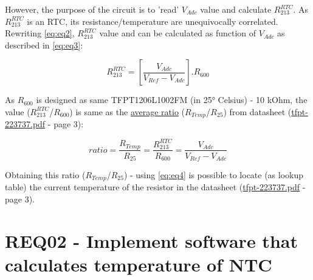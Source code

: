 \documentclass{article}
\begin{document}
	
	However, the purpose of the circuit is to 'read' \(V_{Adc}\) value and calculate \(R_{213}^{RTC}\). As \(R_{213}^{RTC}\) is an RTC, its resistance/temperature are unequivocally correlated. Rewriting \eqref{eq:eq2}, \(R_{213}^{RTC}\) value and can be calculated as function of \(V_{Adc}\) as described in \eqref{eq:eq3}:
	
	\begin{equation}
		R_{213}^{RTC} = \left [ \frac{V_{Adc}}{V_{Ref} - V_{Adc}} \right ].R_{600} \label{eq:eq3}
	\end{equation}
	
	As \(R_{600}\) is designed as same TFPT1206L1002FM (in 25° Celsius) - 10 kOhm, the value (\(R_{213}^{RTC}\)/\(R_{600}\)) is same as the \underline{average ratio} (\(R_{Temp}\)/\(R_{25}\)) from datasheet (\underline{tfpt-223737.pdf} - page 3):
	
	\begin{equation}
	ratio = \frac{R_{Temp}}{R_{25}} = \frac{R_{213}^{RTC}}{R_{600}} = \frac{V_{Adc}}{V_{Ref} - V_{Adc}}
	\label{eq:eq4}
	\end{equation}
	
	Obtaining this ratio (\(R_{Temp}\)/\(R_{25}\)) - using \eqref{eq:eq4} is possible to locate (as lookup table) the current temperature of the resistor in the datasheet (\underline{tfpt-223737.pdf} - page 3).
	
	
\section{REQ02 - Implement software that calculates temperature of NTC}

\lstset{style=mystyle}
\end{document}
